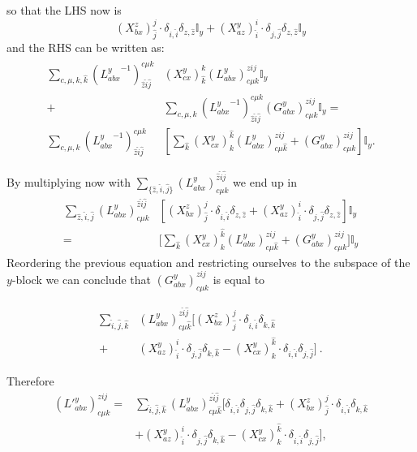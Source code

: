 \documentclass[a4paper,twocolumn,11pt,accepted=2023-02-10]{quantumarticle}
\newcommand{\id}{\mathbb{I}}
\begin{document}
so that the LHS now is
$$
(X_{bx}^z)_{\hat{j}}^{j} {\cdot} \delta_{i,\hat{i}} \delta_{z,\hat{z}}  \id_y+(X_{az}^y)_{\hat{i}}^{i} {\cdot} \delta_{j,\hat{j}}\delta_{z,\hat{z}}\id_y 
$$
and the RHS can be written as:
\begin{align*}
 \sum_{c,\mu,k,\hat{k}}
\left({{{L}}_{abx}^y}^{-1}\right)_{\hat{z}\hat{i}\hat{j}}^{{c}{\mu} \hat{k}}
  & (X_{cx}^y)_{\hat{k}}^{k}  \left({L}_{abx}^y\right)_{c\mu k}^{zij} \id_y \\
+ &
 \sum_{c,\mu,k}
   \left({{{L}}_{abx}^y}^{-1}\right)^{{c}{\mu} {k}}_{\hat{z}\hat{i}\hat{j}} \left({{G}_{abx}^y}\right)_{{c}{\mu} {k}}^{z{i}{j}}\id_y = \\
      \sum_{c,\mu,k} \left({{{L}}_{abx}^y}^{-1}\right)_{\hat{z}\hat{i}\hat{j}}^{{c}{\mu} {k}} & \left [ 
    \sum_{\hat{k}}  (X_{cx}^y)^{\hat{k}}_{k}  \left({L}_{abx}^y\right)_{c\mu \hat{k}}^{zij}  
+
  \left({{G}_{abx}^y}\right)_{{c}{\mu} {k}}^{z{i}{j}} 
   \right ]\id_y.
   \end{align*}


By multiplying now with $\sum_{\{\hat{z},\hat{i},\hat{j}\}} \left({{{L}}_{abx}^y}\right)^{\hat{z}\hat{i}\hat{j}}_{{c}{\mu} {k}}$ we end up in 
\begin{align*}  
\sum_{\hat{z},\hat{i},\hat{j}} \left({{{L}}_{abx}^y}\right)^{\hat{z}\hat{i}\hat{j}}_{{c}{\mu} {k}}& \left [
(X_{bx}^z)_{\hat{j}}^{j} {\cdot} \delta_{i,\hat{i}} \delta_{z,\hat{z}}  +(X_{az}^y)_{\hat{i}}^{i} {\cdot} \delta_{j,\hat{j}}\delta_{z,\hat{z}}
\right]\id_y \\
=& \big[  \sum_{\hat{k}} (X_{cx}^y)^{\hat{k}}_{k}  \left({L}_{abx}^y\right)_{c\mu \hat{k}}^{zij}  
+
  \left({{G}_{abx}^y}\right)_{{c}{\mu} {k}}^{z{i}{j}} 
  \big ] \id_y
\end{align*}
Reordering the previous equation and restricting ourselves to the subspace of the $y$-block we can conclude that $\left({{G}_{abx}^y}\right)_{{c}{\mu} {k}}^{z{i}{j}}$ is equal to

\begin{align*}
\sum_{\hat{i},\hat{j},\hat{k}} & \left({{{L}}_{abx}^y}\right)^{{z}\hat{i}\hat{j}}_{{c}{\mu} \hat{k}} \big [
(X_{bx}^z)_{\hat{j}}^{j} {\cdot} \delta_{i,\hat{i}}\delta_{k,\hat{k}} 
\\  + \  
& (X_{az}^y)_{\hat{i}}^{i} {\cdot} \delta_{j,\hat{j}}\delta_{k,\hat{k}} 
-(X_{cx}^y)^{\hat{k}}_{k} {\cdot} \delta_{i,\hat{i}}\delta_{j,\hat{j}} 
    \big ] \ .
 \end{align*}
 
Therefore
 \begin{align*}
 \left({{{L}'}_{abx}^y}\right)_{{c}{\mu} {k}}^{z{i}{j}}  = & 
 \sum_{\hat{i},\hat{j},\hat{k}} \left({{{L}}_{abx}^y}\right)^{{z}\hat{i}\hat{j}}_{{c}{\mu} \hat{k}} \big [
 \delta_{i,\hat{i}}\delta_{j,\hat{j}}\delta_{k,\hat{k}}
+(X_{bx}^z)_{\hat{j}}^{j} {\cdot} \delta_{i,\hat{i}}\delta_{k,\hat{k}} 
\\
&
+(X_{az}^y)_{\hat{i}}^{i} {\cdot} \delta_{j,\hat{j}}\delta_{k,\hat{k}} 
-(X_{cx}^y)^{\hat{k}}_{k} {\cdot} \delta_{i,\hat{i}}\delta_{j,\hat{j}} 
    \big],
\end{align*}
\end{document}

